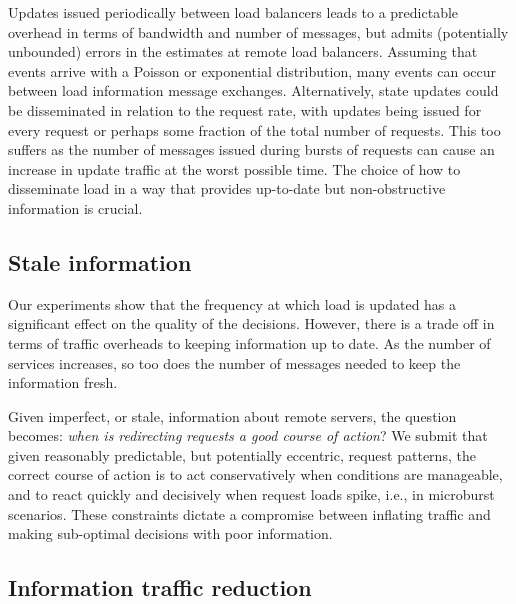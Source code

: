 Updates issued periodically between load balancers leads to a
predictable overhead in terms of bandwidth and number of messages, but
admits (potentially unbounded) errors in the estimates at remote load
balancers. Assuming that events arrive with a Poisson or exponential
distribution, many events can occur between load information message
exchanges.  Alternatively, state updates could be disseminated in
relation to the request rate, with updates being issued for every
request or perhaps some fraction of the total number of requests. This
too suffers as the number of messages issued during bursts of requests
can cause an increase in update traffic at the worst possible
time. The choice of how to disseminate load in a way that provides
up-to-date but non-obstructive information is crucial.


\subsection{Stale information}

Our experiments show that the frequency at which load is updated has a
significant effect on the quality of the decisions. However, there is a trade
off in terms of traffic overheads to keeping information up to date. As the
number of services increases, so too does the number of messages needed to
keep the information fresh. 

Given imperfect, or stale, information about remote servers, the
question becomes: \textit{when is redirecting requests a good course
  of action}? We submit that given reasonably predictable, but
potentially eccentric, request patterns, the correct course of action
is to act conservatively when conditions are manageable, and to react
quickly and decisively when request loads spike, i.e., in microburst
scenarios.  These constraints dictate a
compromise between inflating traffic and making sub-optimal decisions
with poor information.

\subsection{Information traffic reduction} 

